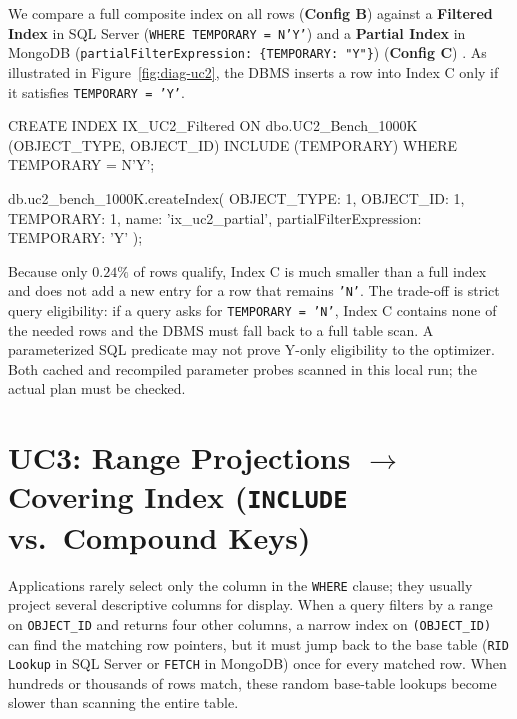 We compare a full composite index on all rows (\textbf{Config B}) against a \textbf{Filtered Index} in SQL Server (\texttt{WHERE TEMPORARY = N'Y'}) and a \textbf{Partial Index} in MongoDB (\texttt{partialFilterExpression: \{TEMPORARY: "Y"\}}) (\textbf{Config C}) \cite{mssqlfiltered,mongopartial}. As illustrated in Figure~\ref{fig:diag-uc2}, the DBMS inserts a row into Index C only if it satisfies \texttt{TEMPORARY = 'Y'}.

\begin{SQLCode}
CREATE INDEX IX_UC2_Filtered ON dbo.UC2_Bench_1000K
  (OBJECT_TYPE, OBJECT_ID) INCLUDE (TEMPORARY)
WHERE TEMPORARY = N'Y';
\end{SQLCode}
\begin{MongoCode}
db.uc2_bench_1000K.createIndex(
  {OBJECT_TYPE: 1, OBJECT_ID: 1, TEMPORARY: 1},
  {name: 'ix_uc2_partial',
   partialFilterExpression: {TEMPORARY: 'Y'}}
);
\end{MongoCode}

Because only $0.24\%$ of rows qualify, Index C is much smaller than a full index and does not add a new entry for a row that remains \texttt{'N'}. 
The trade-off is strict query eligibility: if a query asks for \texttt{TEMPORARY = 'N'}, Index C contains none of the needed rows and the DBMS must fall back to a full table scan. A parameterized SQL predicate may not prove Y-only eligibility to the optimizer. Both cached and recompiled parameter probes scanned in this local run; the actual plan must be checked.



\UCTwoDiagram

\section{UC3: Range Projections \texorpdfstring{$\rightarrow$}{->} Covering Index (\texttt{INCLUDE} vs.\ Compound Keys)}

Applications rarely select only the column in the \texttt{WHERE} clause; they usually project several descriptive columns for display. When a query filters by a range on \texttt{OBJECT\_ID} and returns four other columns, a narrow index on \texttt{(OBJECT\_ID)} can find the matching row pointers, but it must jump back to the base table (\texttt{RID Lookup} in SQL Server or \texttt{FETCH} in MongoDB) once for every matched row. When hundreds or thousands of rows match, these random base-table lookups become slower than scanning the entire table.

